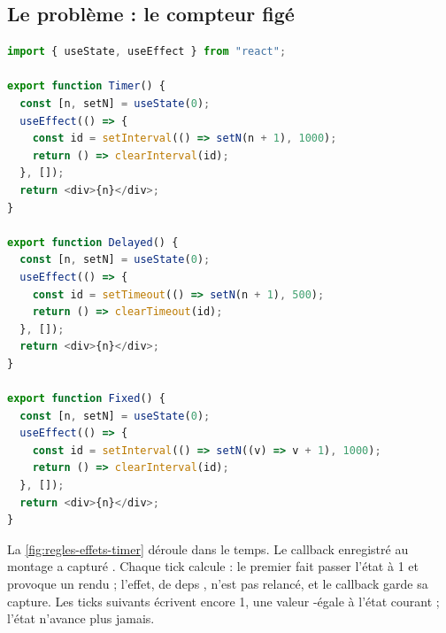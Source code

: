 \subsection{Le problème : le compteur figé}

\begin{lstlisting}[language=TypeScript,caption={\file{/tmp/ch20/timer.tsx} : la forme canonique et deux variantes},label={lst:regles-effets-timer}]
import { useState, useEffect } from "react";

export function Timer() {
  const [n, setN] = useState(0);
  useEffect(() => {
    const id = setInterval(() => setN(n + 1), 1000);
    return () => clearInterval(id);
  }, []);
  return <div>{n}</div>;
}

export function Delayed() {
  const [n, setN] = useState(0);
  useEffect(() => {
    const id = setTimeout(() => setN(n + 1), 500);
    return () => clearTimeout(id);
  }, []);
  return <div>{n}</div>;
}

export function Fixed() {
  const [n, setN] = useState(0);
  useEffect(() => {
    const id = setInterval(() => setN((v) => v + 1), 1000);
    return () => clearInterval(id);
  }, []);
  return <div>{n}</div>;
}
\end{lstlisting}

La \cref{fig:regles-effets-timer} déroule  dans le temps. Le callback enregistré au montage a capturé . Chaque tick calcule  : le premier fait passer l'état à 1 et provoque un rendu ; l'effet, de deps \code{[]}, n'est pas relancé, et le callback garde sa capture. Les ticks suivants écrivent encore 1, une valeur -égale à l'état courant ; l'état n'avance plus jamais.

